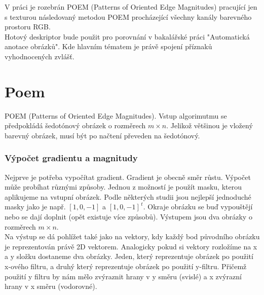 \documentclass{report}
\begin{document}
V práci je rozebrán POEM (Patterns of Oriented Edge Magnitudes) pracující jen s texturou následovaný metodou POEM procházející všechny kanály barevného prostoru RGB. \\

Hotový deskriptor bude použit pro porovnání v bakalářské práci "Automatická anotace obrázků". Kde hlavním tématem je právě spojení příznaků vyhodnocených zvlášť. 

\chapter{Poem}
POEM (Patterns of Oriented Edge Magnitudes). Vstup algorimutmu se předpokládá šedotónový obrázek o rozměrech  $m \times n$. Jelikož většinou je vložený barevný obrázek, musí být po načtení převeden na šedotónový. \cite{SrovnaniDeskriptoru}

\subsection{Výpočet gradientu a magnitudy}
Nejprve je potřeba vypočítat gradient. Gradient je obecně směr růstu. Výpočet může probíhat různými způsoby. Jednou z možností je použít masku, kterou aplikujeme na vstupní obrázek. Podle některých studii jsou nejlepší jednoduché masky jako je např. $[1, 0, -1]$ a $[1, 0, -1]^{\,t}$. Okraje obrázku se buď vypouštějí nebo se dají doplnit (opět existuje více způsobů). Výstupem jsou dva obrázky o rozměrech $m \times n$. \\
Na výstup se dá pohlížet také jako na vektory, kdy každý bod původního obrázku je reprezentován právě 2D vektorem. Analogicky pokud si vektory rozložíme na x a y složku dostaneme dva obrázky. Jeden, který reprezentuje obrázek po použití x-ového filtru, a druhý který reprezentuje obrázek po použití y-filtru. Přičemž použití y filtru by nám mělo zvýraznit hrany v y směru (svislé) a x zvýrazní hrany v x směru (vodorovné). \\
\end{document}
